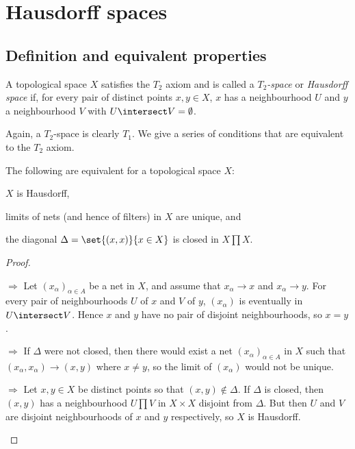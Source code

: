 \documentclass[article, a4paper, 11pt, oneside]{memoir}
\numberwithin{equation}{chapter}
\renewcommand{\implies}{\Rightarrow}
\begin{document}
\chapter{Hausdorff spaces}

\section{Definition and equivalent properties}

\begin{definition}
    A topological space $X$ satisfies the $T_2$ axiom and is called a \emph{$T_2$-space} or \emph{Hausdorff space} if, for every pair of distinct points $x,y \in X$, $x$ has a neighbourhood $U$ and $y$ a neighbourhood $V$ with $U \intersect V = \emptyset$.
\end{definition}
%
Again, a $T_2$-space is clearly $T_1$. We give a series of conditions that are equivalent to the $T_2$ axiom.


\begin{proposition}
    \label{thm:Hausdorff-equivalent-properties}
    The following are equivalent for a topological space $X$:
    \begin{enumprop}
        \item \label{enum:T2-space} $X$ is Hausdorff,
        \item \label{enum:T2-limits_unique} limits of nets (and hence of filters) in $X$ are unique, and
        \item \label{enum:T2-closed_diagonal} the diagonal $\Delta = \set{(x,x)}{x \in X}$ is closed in $X \prod X$.
    \end{enumprop}
\end{proposition}

\begin{proof}
\begin{proofsec}
    \item[\subcref{enum:T2-space} $\implies$ \subcref{enum:T2-limits_unique}]
    Let $(x_\alpha)_{\alpha \in A}$ be a net in $X$, and assume that $x_\alpha \to x$ and $x_\alpha \to y$. For every pair of neighbourhoods $U$ of $x$ and $V$ of $y$, $(x_\alpha)$ is eventually in $U \intersect V$. Hence $x$ and $y$ have no pair of disjoint neighbourhoods, so $x = y$.

    \item[\subcref{enum:T2-limits_unique} $\implies$ \subcref{enum:T2-closed_diagonal}]
    If $\Delta$ were not closed, then there would exist a net $(x_\alpha)_{\alpha \in A}$ in $X$ such that $(x_\alpha, x_\alpha) \to (x,y)$ where $x \neq y$, so the limit of $(x_\alpha)$ would not be unique.

    \item[\subcref{enum:T2-closed_diagonal} $\implies$ \subcref{enum:T2-space}]
    Let $x,y \in X$ be distinct points so that $(x,y) \not\in \Delta$. If $\Delta$ is closed, then $(x,y)$ has a neighbourhood $U \prod V$ in $X \times X$ disjoint from $\Delta$. But then $U$ and $V$ are disjoint neighbourhoods of $x$ and $y$ respectively, so $X$ is Hausdorff.
\end{proofsec}
\end{proof}
\end{document}
